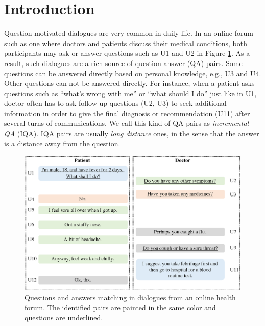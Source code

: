 \section{Introduction}
\label{sec:intro}
Question motivated dialogues are very common in daily life. In an online forum such as one where doctors and patients discuss their medical conditions, both participants may ask or answer questions such as U1 and U2 in Figure \ref{fig:sample}. As a result, such dialogues are a rich source of question-answer (QA) pairs. Some questions can be answered directly based on personal knowledge, e.g., U3 and U4. Other questions can not be answered directly. For instance, when a patient asks questions such as ``what's wrong with me'' or ``what should I do'' just like in U1, doctor often has to ask follow-up questions (U2, U3) to seek additional information in order to give the final diagnosis or recommendation (U11) after several turns of communications. We call this kind of QA pairs as {\em incremental QA} (IQA). IQA pairs are usually {\em long distance} ones, in the sense that the answer is a distance away from the question. 
 

\begin{figure}[th]
    \centering
    \includegraphics[scale=0.32]{pictures/figure3.eps}
    \caption{Questions and answers matching in dialogues from an online health forum. The identified pairs are painted in the same color and questions are underlined.}
    \label{fig:sample}
\end{figure}

